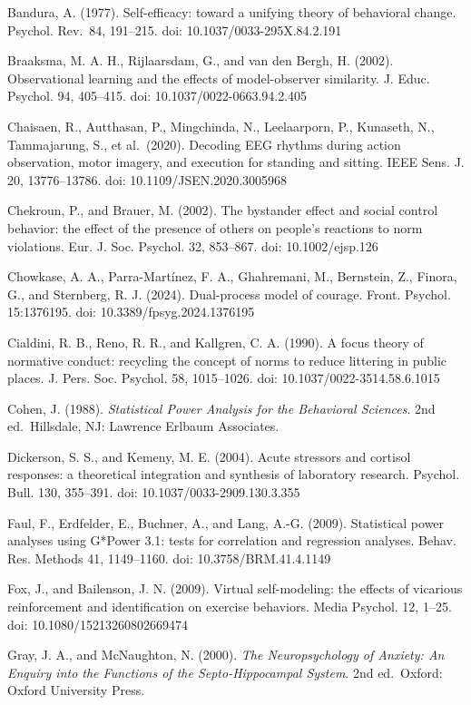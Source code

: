 Bandura, A. (1977). Self-efficacy: toward a unifying theory of
behavioral change. Psychol. Rev.~84, 191--215. doi:
10.1037/0033-295X.84.2.191

Braaksma, M. A. H., Rijlaarsdam, G., and van den Bergh, H. (2002).
Observational learning and the effects of model-observer similarity. J.
Educ. Psychol. 94, 405--415. doi: 10.1037/0022-0663.94.2.405

Chaisaen, R., Autthasan, P., Mingchinda, N., Leelaarporn, P., Kunaseth,
N., Tammajarung, S., et al.~(2020). Decoding EEG rhythms during action
observation, motor imagery, and execution for standing and sitting. IEEE
Sens. J. 20, 13776--13786. doi: 10.1109/JSEN.2020.3005968

Chekroun, P., and Brauer, M. (2002). The bystander effect and social
control behavior: the effect of the presence of others on people's
reactions to norm violations. Eur. J. Soc. Psychol. 32, 853--867. doi:
10.1002/ejsp.126

Chowkase, A. A., Parra-Martínez, F. A., Ghahremani, M., Bernstein, Z.,
Finora, G., and Sternberg, R. J. (2024). Dual-process model of courage.
Front. Psychol. 15:1376195. doi: 10.3389/fpsyg.2024.1376195

Cialdini, R. B., Reno, R. R., and Kallgren, C. A. (1990). A focus theory
of normative conduct: recycling the concept of norms to reduce littering
in public places. J. Pers. Soc. Psychol. 58, 1015--1026. doi:
10.1037/0022-3514.58.6.1015

Cohen, J. (1988). \emph{Statistical Power Analysis for the Behavioral
Sciences}. 2nd ed.~Hillsdale, NJ: Lawrence Erlbaum Associates.

Dickerson, S. S., and Kemeny, M. E. (2004). Acute stressors and cortisol
responses: a theoretical integration and synthesis of laboratory
research. Psychol. Bull. 130, 355--391. doi: 10.1037/0033-2909.130.3.355

Faul, F., Erdfelder, E., Buchner, A., and Lang, A.-G. (2009).
Statistical power analyses using G*Power 3.1: tests for correlation and
regression analyses. Behav. Res. Methods 41, 1149--1160. doi:
10.3758/BRM.41.4.1149

Fox, J., and Bailenson, J. N. (2009). Virtual self-modeling: the effects
of vicarious reinforcement and identification on exercise behaviors.
Media Psychol. 12, 1--25. doi: 10.1080/15213260802669474

Gray, J. A., and McNaughton, N. (2000). \emph{The Neuropsychology of
Anxiety: An Enquiry into the Functions of the Septo-Hippocampal System}.
2nd ed.~Oxford: Oxford University Press.

